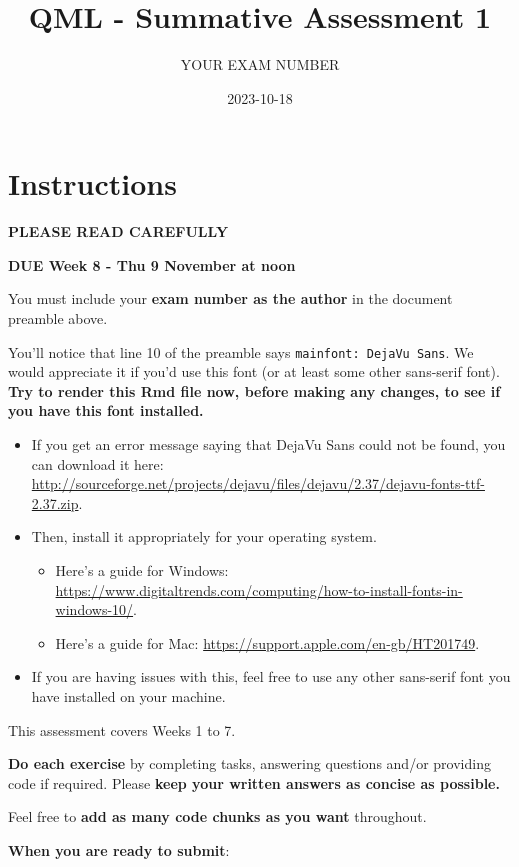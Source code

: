 \documentclass[
]{article}
\title{QML - Summative Assessment 1}
\author{YOUR EXAM NUMBER}
\date{2023-10-18}
\providecommand{\tightlist}{%
  \setlength{\itemsep}{0pt}\setlength{\parskip}{0pt}}
\begin{document}
\maketitle

\section{Instructions}\label{instructions}

\textbf{PLEASE READ CAREFULLY}

\textbf{DUE Week 8 - Thu 9 November at noon}

You must include your \textbf{exam number as the author} in the document
preamble above.

You'll notice that line 10 of the preamble says
\texttt{mainfont:\ DejaVu\ Sans}. We would appreciate it if you'd use
this font (or at least some other sans-serif font). \textbf{Try to
render this Rmd file now, before making any changes, to see if you have
this font installed.}

\begin{itemize}
\tightlist
\item
  If you get an error message saying that DejaVu Sans could not be
  found, you can download it here:
  \url{http://sourceforge.net/projects/dejavu/files/dejavu/2.37/dejavu-fonts-ttf-2.37.zip}.
\item
  Then, install it appropriately for your operating system.

  \begin{itemize}
  \tightlist
  \item
    Here's a guide for Windows:
    \url{https://www.digitaltrends.com/computing/how-to-install-fonts-in-windows-10/}.
  \item
    Here's a guide for Mac:
    \url{https://support.apple.com/en-gb/HT201749}.
  \end{itemize}
\item
  If you are having issues with this, feel free to use any other
  sans-serif font you have installed on your machine.
\end{itemize}

This assessment covers Weeks 1 to 7.

\textbf{Do each exercise} by completing tasks, answering questions
and/or providing code if required. Please \textbf{keep your written
answers as concise as possible.}

Feel free to \textbf{add as many code chunks as you want} throughout.

\textbf{When you are ready to submit}:
\end{document}
